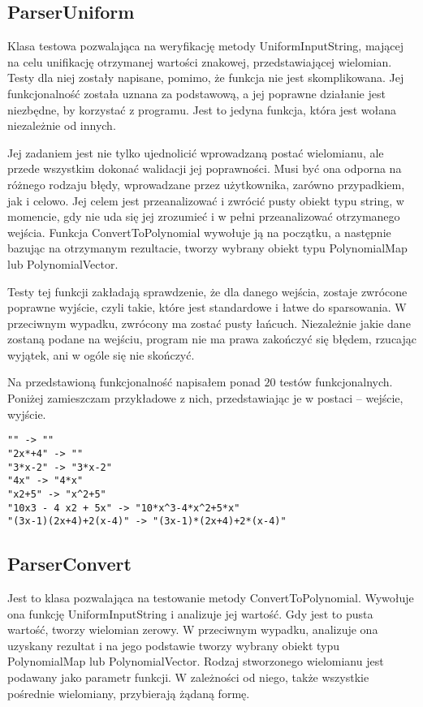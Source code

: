 \documentclass[twoside,a4paper]{book}
\begin{document}
\subsection{ParserUniform}

Klasa testowa pozwalająca na weryfikację metody UniformInputString, mającej na celu unifikację otrzymanej wartości znakowej, przedstawiającej wielomian. Testy dla niej zostały napisane, pomimo, że funkcja nie jest skomplikowana. Jej funkcjonalność została uznana za podstawową, a jej poprawne działanie jest niezbędne, by korzystać z programu. Jest to jedyna funkcja, która jest wołana niezależnie od innych.

Jej zadaniem jest nie tylko ujednolicić wprowadzaną postać wielomianu, ale przede wszystkim dokonać walidacji jej poprawności. Musi być ona odporna na różnego rodzaju błędy, wprowadzane przez użytkownika, zarówno przypadkiem, jak i celowo. Jej celem jest przeanalizować i zwrócić pusty obiekt typu string, w momencie, gdy nie uda się jej zrozumieć i w pełni przeanalizować otrzymanego wejścia. Funkcja ConvertToPolynomial wywołuje ją na początku, a następnie bazując na otrzymanym rezultacie, tworzy wybrany obiekt typu PolynomialMap lub PolynomialVector.

Testy tej funkcji zakładają sprawdzenie, że dla danego wejścia, zostaje zwrócone poprawne wyjście, czyli takie, które jest standardowe i łatwe do sparsowania. W przeciwnym wypadku, zwrócony ma zostać pusty łańcuch. Niezależnie jakie dane zostaną podane na wejściu, program nie ma prawa zakończyć się błędem, rzucając wyjątek, ani w ogóle się nie skończyć.

Na przedstawioną funkcjonalność napisałem ponad $20$ testów funkcjonalnych. Poniżej zamieszczam przykładowe z nich, przedstawiając je w postaci -- wejście, wyjście. 

\begin{lstlisting}
"" -> ""
"2x*+4" -> ""
"3*x-2" -> "3*x-2"
"4x" -> "4*x"
"x2+5" -> "x^2+5"
"10x3 - 4 x2 + 5x" -> "10*x^3-4*x^2+5*x"
"(3x-1)(2x+4)+2(x-4)" -> "(3x-1)*(2x+4)+2*(x-4)"
\end{lstlisting}

\subsection{ParserConvert}

Jest to klasa pozwalająca na testowanie metody ConvertToPolynomial. Wywołuje ona funkcję UniformInputString i analizuje jej wartość. Gdy jest to pusta wartość, tworzy wielomian zerowy. W przeciwnym wypadku, analizuje ona uzyskany rezultat i na jego podstawie tworzy wybrany obiekt typu PolynomialMap lub PolynomialVector. Rodzaj stworzonego wielomianu jest podawany jako parametr funkcji. W zależności od niego, także wszystkie pośrednie wielomiany, przybierają żądaną formę.
\end{document}
